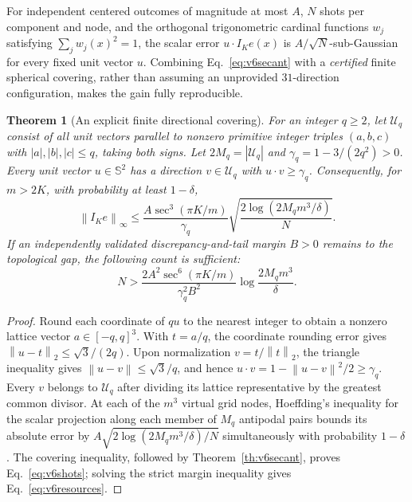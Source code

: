 \documentclass[aps,prd,onecolumn,notitlepage,11pt,superscriptaddress,longbibliography]{revtex4-2}
\newtheorem{theorem}{Theorem}
\newcommand{\norm}[1]{\left\lVert#1\right\rVert}
\begin{document}
For independent centered outcomes of magnitude at most $A$, $N$ shots per component and node, and the orthogonal trigonometric cardinal functions $w_j$ satisfying $\sum_jw_j(x)^2=1$, the scalar error $u\cdot I_Ke(x)$ is $A/\sqrt N$-sub-Gaussian for every fixed unit vector $u$. Combining Eq.~\eqref{eq:v6secant} with a \emph{certified} finite spherical covering, rather than assuming an unprovided $31$-direction configuration, makes the gain fully reproducible.

\begin{theorem}[An explicit finite directional covering]\label{th:v6net}
For an integer $q\ge2$, let $\mathcal U_q$ consist of all unit vectors parallel to nonzero primitive integer triples $(a,b,c)$ with $|a|,|b|,|c|\le q$, taking both signs. Let $2M_q=|\mathcal U_q|$ and $\gamma_q=1-3/(2q^2)>0$. Every unit vector $u\in\mathbb S^2$ has a direction $v\in\mathcal U_q$ with $u\cdot v\ge\gamma_q$. Consequently, for $m>2K$, with probability at least $1-\delta$,
\begin{equation}\label{eq:v6shots}
\boxed{\norm{I_Ke}_{\infty}\le \frac{A\sec^3(\pi K/m)}{\gamma_q}\sqrt{\frac{2\log(2M_qm^3/\delta)}{N}}.}
\end{equation}
If an independently validated discrepancy-and-tail margin $B>0$ remains to the topological gap, the following count is sufficient:
\begin{equation}\label{eq:v6resources}
\boxed{N>\frac{2A^2\sec^6(\pi K/m)}{\gamma_q^2 B^2}\log\frac{2M_qm^3}{\delta}.}
\end{equation}
\end{theorem}
\begin{proof}
Round each coordinate of $qu$ to the nearest integer to obtain a nonzero lattice vector $a\in[-q,q]^3$. With $t=a/q$, the coordinate rounding error gives $\norm{u-t}_2\le\sqrt3/(2q)$. Upon normalization $v=t/\norm{t}_2$, the triangle inequality gives $\norm{u-v}\le\sqrt3/q$, and hence $u\cdot v=1-\norm{u-v}^2/2\ge\gamma_q$. Every $v$ belongs to $\mathcal U_q$ after dividing its lattice representative by the greatest common divisor. At each of the $m^3$ virtual grid nodes, Hoeffding's inequality for the scalar projection along each member of $M_q$ antipodal pairs bounds its absolute error by $A\sqrt{2\log(2M_qm^3/\delta)/N}$ simultaneously with probability $1-\delta$. The covering inequality, followed by Theorem~\ref{th:v6secant}, proves Eq.~\eqref{eq:v6shots}; solving the strict margin inequality gives Eq.~\eqref{eq:v6resources}.
\end{proof}
\end{document}
